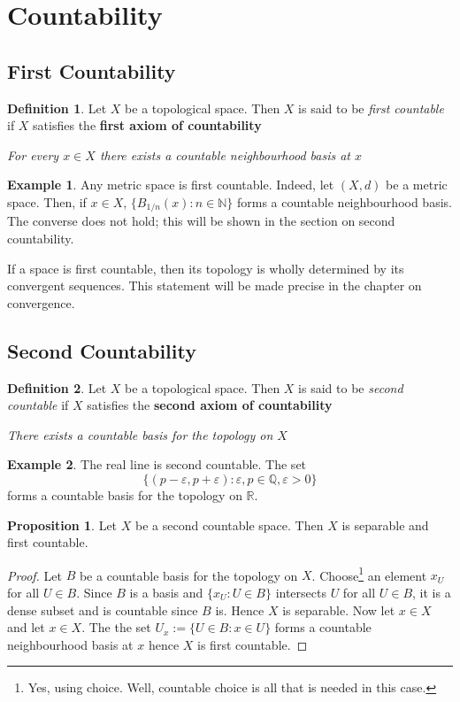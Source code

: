 \documentclass{book}
\theoremstyle{definition}
\newtheorem{proposition}{Proposition}[section]
\newtheorem{definition}{Definition}[section]
\newtheorem{example}{Example}[section]
\theoremstyle{remark}
\newcommand{\R}{\mathbb{R}}
\newcommand{\Q}{\mathbb{Q}}
\newcommand{\N}{\mathbb{N}}
\begin{document}
\section{Countability}
\subsection{First Countability}
\begin{definition}
Let $X$ be a topological space. Then $X$ is said to be \textit{first countable} if $X$ satisfies the \textbf{first axiom of countability}
\begin{center}
    \textit{For every $x\in X$ there exists a countable neighbourhood basis at $x$}
\end{center}
\end{definition}

\begin{example}
Any metric space is first countable. Indeed, let $(X,d)$ be a metric space. Then, if $x\in X$, $\{B_{1/n}(x):n\in\N\}$ forms a countable neighbourhood basis. The converse does not hold; this will be shown in the section on second countability.
\end{example}

If a space is first countable, then its topology is wholly determined by its convergent sequences. This statement will be made precise in the chapter on convergence.

\subsection{Second Countability}
\begin{definition}
Let $X$ be a topological space. Then $X$ is said to be \textit{second countable} if $X$ satisfies the \textbf{second axiom of countability}
\begin{center}
    \textit{There exists a countable basis for the topology on $X$}
\end{center}
\end{definition}

\begin{example}
\label{Rsecondcountable}
The real line is second countable. The set
$$\{(p-\varepsilon,p+\varepsilon):\varepsilon, p\in\Q,\varepsilon>0\}$$
forms a countable basis for the topology on $\R$.
\end{example}

\begin{proposition}
Let $X$ be a second countable space. Then $X$ is separable and first countable.
\end{proposition}
\begin{proof}
Let $B$ be a countable basis for the topology on $X$. Choose\footnote{Yes, using choice. Well, countable choice is all that is needed in this case.} an element $x_U$ for all $U\in B$. Since $B$ is a basis and $\{x_U:U\in B\}$ intersects $U$ for all $U\in B$, it is a dense subset and is countable since $B$ is. Hence $X$ is separable. Now let $x\in X$ and let $x\in X$. The the set $U_x:=\{U\in B:x\in U\}$ forms a countable neighbourhood basis at $x$ hence $X$ is first countable.
\end{proof}
\end{document}
